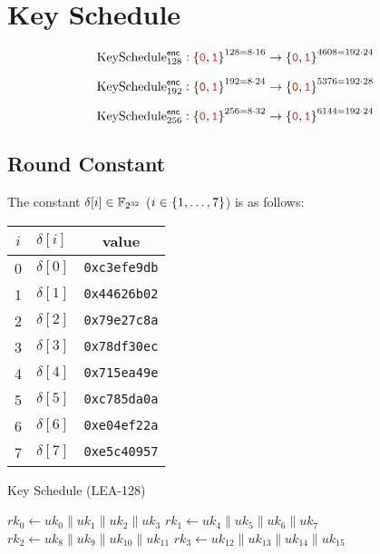 \section{Key Schedule}

$$
\text{KeySchedule}^{\mathsf{enc}}_{128}:\set{\textcolor{red}{\texttt{0}},\textcolor{red}{\texttt{1}}}^{128=8\cdot 16}\to\set{\textcolor{red}{\texttt{0}},\textcolor{red}{\texttt{1}}}^{4608=192\cdot 24}
$$

$$
\text{KeySchedule}^{\mathsf{enc}}_{192}:\set{\textcolor{red}{\texttt{0}},\textcolor{red}{\texttt{1}}}^{192=8\cdot 24}\to\set{\textcolor{red}{\texttt{0}},\textcolor{red}{\texttt{1}}}^{5376=192\cdot 28}
$$

$$
\text{KeySchedule}^{\mathsf{enc}}_{256}:\set{\textcolor{red}{\texttt{0}},\textcolor{red}{\texttt{1}}}^{256=8\cdot 32}\to\set{\textcolor{red}{\texttt{0}},\textcolor{red}{\texttt{1}}}^{6144=192\cdot 24}
$$

\subsection{Round Constant}
The constant $\delta[i]\in\mathbb{F}_{2^{32}}$ ($i\in\set{1,\dots,7}$) is as follows:
\begin{table}[h!]\centering\renewcommand{\arraystretch}{1.5} %
	\begin{tabular}{c|lc}
		$i$ & $\delta[i]$ & value\\
		\midrule
		0 & $\delta[0]$ & \texttt{0xc3efe9db}\\
		1 & $\delta[1]$ & \texttt{0x44626b02}\\
		2 & $\delta[2]$ & \texttt{0x79e27c8a}\\
		3 & $\delta[3]$ & \texttt{0x78df30ec}\\
		4 & $\delta[4]$ & \texttt{0x715ea49e}\\
		5 & $\delta[5]$ & \texttt{0xc785da0a}\\
		6 & $\delta[6]$ & \texttt{0xe04ef22a}\\
		7 & $\delta[7]$ & \texttt{0xe5c40957}
	\end{tabular}
\end{table}

\begin{algorithm}[H]
	\caption{Key Schedule (LEA-128)}
	
	\BlankLine
	\( rk_0 \leftarrow uk_0\parallel uk_1\parallel uk_2 \parallel uk_3 \)\;
	\( rk_1 \leftarrow uk_4\parallel uk_5\parallel uk_6 \parallel uk_7 \)\;
	\( rk_2 \leftarrow uk_8\parallel uk_9\parallel uk_{10} \parallel uk_{11} \)\;
	\( rk_3 \leftarrow uk_{12}\parallel uk_{13}\parallel uk_{14} \parallel uk_{15} \)\;
\end{algorithm}

